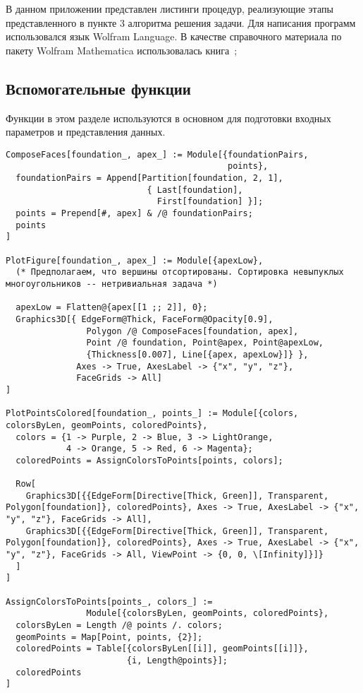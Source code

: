 \documentclass[../main.tex]{subfiles}
\begin{document}
\lstset{style=wolfram_mathematica}

В данном приложении представлен листинги процедур, реализующие этапы представленного в пункте 3 алгоритма решения задачи. Для написания программ использовался язык {\ttfamily Wolfram Language}. В качестве справочного материала по пакету {\ttfamily Wolfram Mathematica} использовалась книга~\cite{WOLFRAM:2003};

\subsection{Вспомогательные функции}
Функции в этом разделе используются в основном для подготовки входных параметров и представления данных.
\begin{lstlisting}
ComposeFaces[foundation_, apex_] := Module[{foundationPairs,
                                            points},
  foundationPairs = Append[Partition[foundation, 2, 1],
                            { Last[foundation],
                              First[foundation] }];
  points = Prepend[#, apex] & /@ foundationPairs;
  points
]

PlotFigure[foundation_, apex_] := Module[{apexLow},
  (* Предполагаем, что вершины отсортированы. Сортировка невыпуклых многоугольников -- нетривиальная задача *)

  apexLow = Flatten@{apex[[1 ;; 2]], 0};
  Graphics3D[{ EdgeForm@Thick, FaceForm@Opacity[0.9],
                Polygon /@ ComposeFaces[foundation, apex],
                Point /@ foundation, Point@apex, Point@apexLow,
                {Thickness[0.007], Line[{apex, apexLow}]} },
              Axes -> True, AxesLabel -> {"x", "y", "z"},
              FaceGrids -> All]
]

PlotPointsColored[foundation_, points_] := Module[{colors, colorsByLen, geomPoints, coloredPoints},
  colors = {1 -> Purple, 2 -> Blue, 3 -> LightOrange,
            4 -> Orange, 5 -> Red, 6 -> Magenta};
  coloredPoints = AssignColorsToPoints[points, colors];

  Row[
    Graphics3D[{{EdgeForm[Directive[Thick, Green]], Transparent, Polygon[foundation]}, coloredPoints}, Axes -> True, AxesLabel -> {"x", "y", "z"}, FaceGrids -> All],
    Graphics3D[{{EdgeForm[Directive[Thick, Green]], Transparent, Polygon[foundation]}, coloredPoints}, Axes -> True, AxesLabel -> {"x", "y", "z"}, FaceGrids -> All, ViewPoint -> {0, 0, \[Infinity]}]}
  ]
]

AssignColorsToPoints[points_, colors_] :=
                Module[{colorsByLen, geomPoints, coloredPoints},
  colorsByLen = Length /@ points /. colors;
  geomPoints = Map[Point, points, {2}];
  coloredPoints = Table[{colorsByLen[[i]], geomPoints[[i]]},
                        {i, Length@points}];
  coloredPoints
]


\end{lstlisting}
\end{document}
